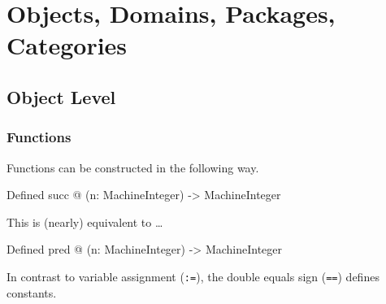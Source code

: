 \section{Objects, Domains, Packages, Categories}

\subsection{Object Level}

\begin{frame}[fragile]
  \frametitle<presentation>{Functions}
  Functions can be constructed in the following way.

\begin{myverbatim}
Defined succ @ (n: MachineInteger) -> MachineInteger
\end{myverbatim}

  This is (nearly) equivalent to \ldots
\begin{myverbatim}
Defined pred @ (n: MachineInteger) -> MachineInteger
\end{myverbatim}
In contrast to variable assignment (\texttt{:=}), the double equals
sign (\texttt{==}) defines constants.
\end{frame}









